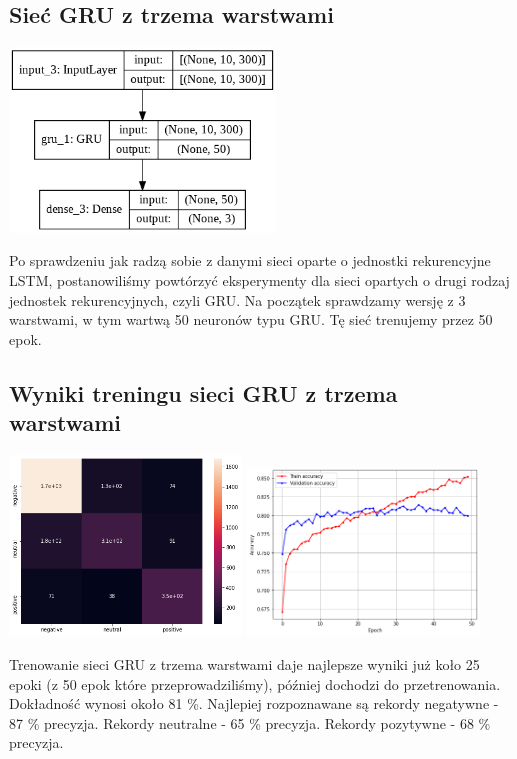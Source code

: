 \documentclass[11pt, a4paper, notitlepage]{report}
\begin{document}
\subsection{Sieć GRU z trzema warstwami}
\begin{center}
\includegraphics[width=200pt]{graphics/model_GRU_3_warstwy_10.png}
\end{center}
Po sprawdzeniu jak radzą sobie z danymi sieci oparte o jednostki rekurencyjne LSTM, postanowiliśmy powtórzyć eksperymenty dla sieci opartych o drugi rodzaj jednostek rekurencyjnych, czyli GRU. Na początek sprawdzamy wersję z 3 warstwami, w tym wartwą 50 neuronów typu GRU. Tę sieć trenujemy przez 50 epok.

\subsection{Wyniki treningu sieci GRU z trzema warstwami}
\begin{center}
\includegraphics[width=175pt]{graphics/heatmap_GRU_10_slow.png}
\includegraphics[width=175pt]{graphics/accuracy_GRU_10_slow.png}
\end{center}
Trenowanie sieci GRU z trzema warstwami daje najlepsze wyniki już koło 25 epoki (z 50 epok które przeprowadziliśmy), później dochodzi do przetrenowania. Dokładność wynosi około 81 \%. Najlepiej rozpoznawane są rekordy negatywne - 87 \% precyzja. Rekordy neutralne - 65 \% precyzja. Rekordy pozytywne - 68 \% precyzja.
\end{document}
